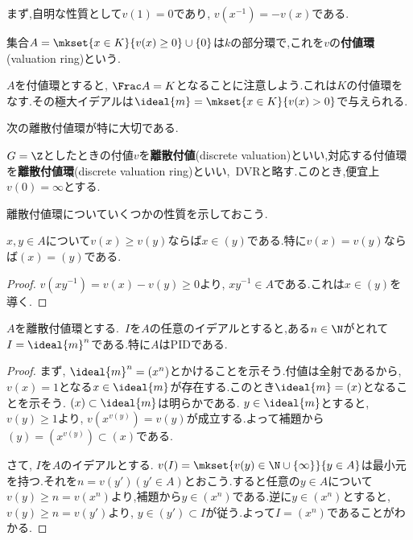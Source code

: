 まず,自明な性質として$v(1)=0$であり, $v(x^{-1})=-v(x)$である.

\begin{defi}
	集合$A=\mkset{x\in K}{v(x)\geq0}\cup\{0\}$は$k$の部分環で,これを$v$の\textbf{付値環}(valuation ring)という.
\end{defi}

$A$を付値環とすると, $\Frac A=K$となることに注意しよう.これは$K$の付値環をなす.その極大イデアルは$\ideal{m}=\mkset{x\in K}{v(x)>0}$で与えられる.

次の離散付値環が特に大切である.
\begin{defi}[離散付値]
	$G=\Z$としたときの付値$v$を\textbf{離散付値}(discrete valuation)といい,対応する付値環を\textbf{離散付値環}(discrete valuation ring)といい,~DVRと略す.このとき,便宜上$v(0)=\infty$とする.
\end{defi}

離散付値環についていくつかの性質を示しておこう.

\begin{lem}
	$x,y\in A$について$v(x)\geq v(y)$ならば$x\in (y)$である.特に$v(x)=v(y)$ならば$(x)=(y)$である.
\end{lem}

\begin{proof}
	$v(xy^{-1})=v(x)-v(y)\geq0$より, $xy^{-1}\in A$である.これは$x\in (y)$を導く.
\end{proof}

\begin{prop}\label{prop:離散付値環の性質}
	$A$を離散付値環とする.~$I$を$A$の任意のイデアルとすると,ある$n\in\N$がとれて$I=\ideal{m}^n$である.特に$A$はPIDである.
\end{prop}

\begin{proof}
	まず, $\ideal{m}^n=(x^n)$とかけることを示そう.付値は全射であるから, $v(x)=1$となる$x\in\ideal{m}$が存在する.このとき$\ideal{m}=(x)$となることを示そう. $(x)\subset\ideal{m}$は明らかである. $y\in\ideal{m}$とすると, $v(y)\geq1$より, $v(x^{v(y)})=v(y)$が成立する.よって補題から$(y)=(x^{v(y)})\subset(x)$である.
	
	さて, $I$を$A$のイデアルとする. $v(I)=\mkset{v(y)\in\N\cup\{\infty\}}{y\in A}$は最小元を持つ.それを$n=v(y') (y'\in A)$とおこう.すると任意の$y\in A$について$v(y)\geq n=v(x^n)$より,補題から$y\in (x^n)$である.逆に$y\in(x^n)$とすると, $v(y)\geq n=v(y')$より, $y\in(y')\subset I$が従う.よって$I=(x^n)$であることがわかる.
\end{proof}

